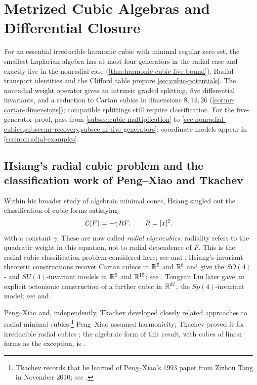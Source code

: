\section[Metrized Cubic Algebras]{Metrized Cubic Algebras and Differential Closure}
\label{sec:cubic-algebraic-theory}

For an essential irreducible harmonic cubic with minimal regular zero
set, the smallest Laplacian algebra has at most four generators in the
radial case and exactly five in the nonradial case
(\cref{thm:harmonic-cubic-five-bound}). Radial transport identities
and the Clifford table prepare \cref{sec:cubic-potentials}.
The nonradial weight operator gives an intrinsic graded splitting,
five differential invariants, and a reduction to Cartan cubics in
dimensions $8,14,26$ (\cref{cor:nr-cartan-dimensions}); compatible
splittings still require classification. For the five-generator proof,
pass from \cref{subsec:cubic-multiplication} to
\cref{sec:nonradial-cubics,subsec:nr-recovery,subsec:nr-five-generators};
coordinate models appear in \cref{sec:nonradial-examples}.

\subsection[Hsiang's problem and radial cubic classification]
{Hsiang's radial cubic problem and the classification work of
Peng--Xiao and Tkachev}
\label{sec:cubic-history}

Within his broader study of algebraic minimal cones, Hsiang
\cite{Hsiang67} singled out the classification of cubic forms satisfying
\[
 \mathcal L(F)=-\gamma RF,\qquad R=|x|^2,
\]
with a constant $\gamma$. These are now called \emph{radial
eigencubics}; radiality refers to the quadratic weight in this equation,
not to radial dependence of $F$. This is the radial cubic classification
problem considered here; see \cite[Section~1.1]{TkachevClassification10}
and \cite[Section~1]{FoxTkachev24}.
Hsiang's invariant-theoretic constructions recover Cartan cubics in
$\mathbb R^5$ and $\mathbb R^8$ and give the $SO(4)$- and $SU(4)$-invariant
models in $\mathbb R^9$ and $\mathbb R^{15}$; see
\cite[Section~6.1]{TkachevClassification10}.
Tongyan Liu \cite{Liu89} later gave an explicit octonionic construction
of a further cubic in $\mathbb R^{27}$, the $Sp(4)$-invariant model;
see \cite[Example~4 and Theorem~C]{PengXiao93} and
\cite[Section~6, p.~1562]{HoppeTkachev19}.

Peng--Xiao \cite{PengXiao93} and, independently, Tkachev
\cite{TkachevClifford10,TkachevClassification10} developed closely
related approaches to radial minimal cubics.\footnote{Tkachev records
that he learned of Peng--Xiao's 1993 paper from Zizhou Tang in November
2010; see \cite[Remark~1, p.~40]{TkachevMiklyukov19}.}
Peng--Xiao assumed harmonicity; Tkachev proved it for irreducible radial
cubics \cite[Theorem~1]{TkachevClassification10}; the algebraic
form of this result, with cubes of linear forms as the exception, is
\cite[Theorem~6.6.1]{NadirashviliTkachevVladut14}.

